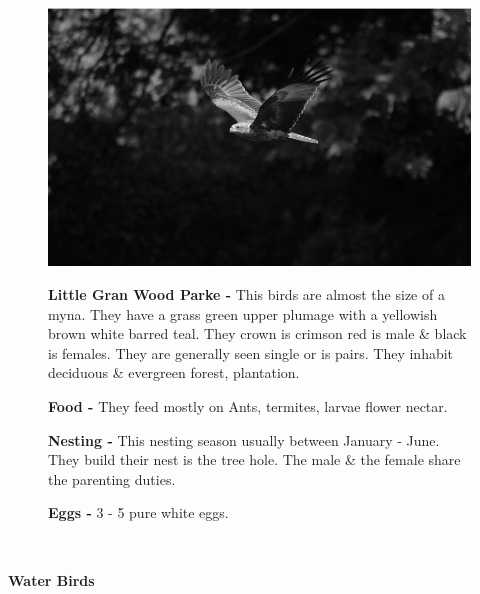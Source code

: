 \begin{figure}[H]
\begin{center}
\includegraphics{figure/Land_birds/01_pariah_kite/pariah-kite.eps}
\end{center}
\medskip
\noindent
{\bf Little Gran Wood Parke -} This birds are almost the size of a myna. They have a grass green upper plumage with a yellowish brown white barred teal. They crown is crimson red is male \& black is females. They are generally seen single or is pairs. They inhabit deciduous \& evergreen forest, plantation.

\medskip
{\bf Food -} They feed mostly on Ants, termites, larvae flower nectar.

{\bf Nesting -} This nesting season usually between January - June. They  build their nest is the tree hole. The male \& the female share the parenting duties.

{\bf Eggs -} 3 - 5 pure white eggs.
\end{figure}

\vfill\eject

~\phantom{a}
\thispagestyle{empty}
\vfill

\begin{center}
{\huge\sf\bfseries Water Birds}
\end{center}


\vfill\eject


~\phantom{a}
\vfill

